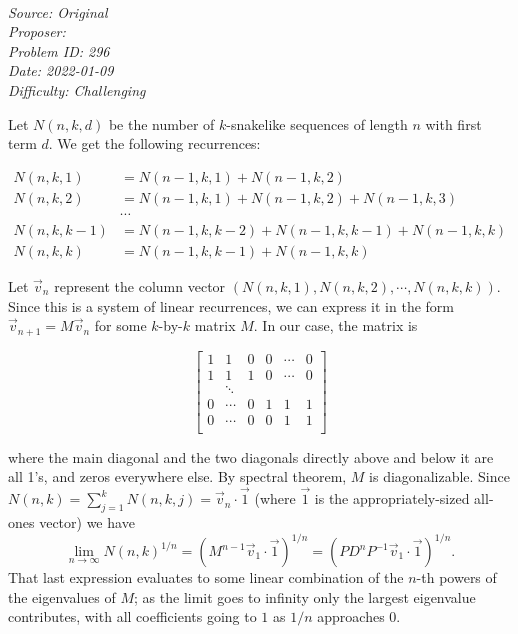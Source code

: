\SSbreak\\
\emph{Source: Original}\\
\emph{Proposer: \Pcryo}\\
\emph{Problem ID: 296}\\
\emph{Date: 2022-01-09}\\
\emph{Difficulty: Challenging}\\
\SSbreak

\bigskip

\begin{solution}\hfil\medskip
  
    Let $N(n, k, d)$ be the number of $k$-snakelike sequences of length $n$ with first term $d$. 
    We get the following recurrences: 

    \begin{align*}
        N(n, k, 1) &= N(n - 1, k, 1) + N(n - 1, k, 2) \\
        N(n, k, 2) &= N(n - 1, k, 1) + N(n - 1, k, 2) + N(n - 1, k, 3) \\
        &\cdots \\
        N(n, k, k - 1) &= N(n - 1, k, k - 2) + N(n - 1, k, k - 1) + N(n - 1, k, k) \\
        N(n, k, k) &= N(n - 1, k, k - 1) + N(n - 1, k, k)
    \end{align*}

    Let $\vec v_n$ represent the column vector $\left(N(n, k, 1), N(n, k, 2), \cdots , N(n, k, k)\right).$ 
    Since this is a system of linear recurrences, we can express it in the form $\vec v_{n + 1} = M\vec v_n$ for 
    some $k$-by-$k$ matrix $M$. In our case, the matrix is 
    
    $$\begin{bmatrix}
        1 & 1 & 0 & 0 & \cdots & 0 \\
        1 & 1 & 1 & 0 & \cdots & 0 \\
          & \ddots \\
        0 & \cdots & 0 & 1 & 1 & 1 \\
        0 & \cdots & 0 & 0 & 1 & 1 \\
    \end{bmatrix}$$

    where the main diagonal and the two diagonals directly above and below it are all 1's, and 
    zeros everywhere else. By spectral theorem, $M$ is diagonalizable. Since $N(n, k) = 
    \sum_{j = 1}^k N(n, k, j) = \vec v_n \cdot \vec 1$ (where $\vec 1$ is the 
    appropriately-sized all-ones vector) we have 
    $$\lim_{n \to \infty} N(n, k)^{1/n} = \left(M^{n - 1} \vec v_1 \cdot \vec 1\right)^{1/n} 
    = \left(PD^nP^{-1}\vec v_1 \cdot \vec 1\right)^{1/n}.$$ 
    That last expression evaluates to some linear combination of the $n$-th powers of the 
    eigenvalues of $M$; as the limit goes to infinity only the largest eigenvalue contributes, 
    with all coefficients going to $1$ as $1/n$ approaches $0$. \medskip 


\end{solution}
